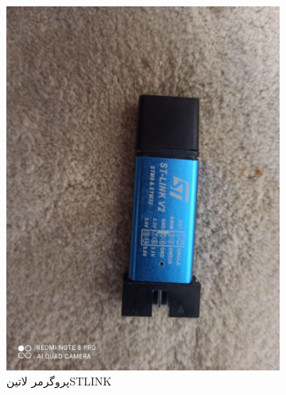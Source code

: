 \begin{figure}[H]
	\begin{subfigure}[b]{0.5\textwidth}
		\includegraphics[width=\linewidth]{Assets/stlink.jpg}
		\caption{پروگرمر ‌لاتین{STLINK}}
		\label{fig:stlink}
	\end{subfigure}
	\begin{subfigure}[b]{0.5\textwidth}

\end{subfigure}
\end{figure}
